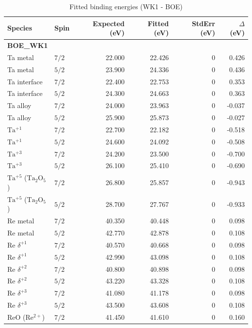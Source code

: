 \documentclass[12pt]{article}
\begin{document}
\begin{table}[H]
\centering
\begin{threeparttable}
\caption{Fitted binding energies (WK1 - BOE)}
\begin{tabular}{llrrrr}
\toprule
Species & Spin & Expected (eV) & Fitted (eV) & StdErr (eV) & $\Delta$ (eV) \\
\midrule
\multicolumn{6}{l}{\textbf{BOE\_WK1}} \\
Ta metal & $7/2$ & 22.000 & 22.426 & 0 & 0.426 \\
Ta metal & $5/2$ & 23.900 & 24.336 & 0 & 0.436 \\
Ta interface & $7/2$ & 22.400 & 22.753 & 0 & 0.353 \\
Ta interface & $5/2$ & 24.300 & 24.663 & 0 & 0.363 \\
Ta alloy & $7/2$ & 24.000 & 23.963 & 0 & -0.037 \\
Ta alloy & $5/2$ & 25.900 & 25.873 & 0 & -0.027 \\
$\mathrm{Ta^{+1}}$ & $7/2$ & 22.700 & 22.182 & 0 & -0.518 \\
$\mathrm{Ta^{+1}}$ & $5/2$ & 24.600 & 24.092 & 0 & -0.508 \\
$\mathrm{Ta^{+3}}$ & $7/2$ & 24.200 & 23.500 & 0 & -0.700 \\
$\mathrm{Ta^{+3}}$ & $5/2$ & 26.100 & 25.410 & 0 & -0.690 \\
$\mathrm{Ta^{+5}}$ ($\mathrm{Ta_2O_5}$) & $7/2$ & 26.800 & 25.857 & 0 & -0.943 \\
$\mathrm{Ta^{+5}}$ ($\mathrm{Ta_2O_5}$) & $5/2$ & 28.700 & 27.767 & 0 & -0.933 \\
Re metal & $7/2$ & 40.350 & 40.448 & 0 & 0.098 \\
Re metal & $5/2$ & 42.770 & 42.878 & 0 & 0.108 \\
$\mathrm{Re}$ $\delta^{+1}$ & $7/2$ & 40.570 & 40.668 & 0 & 0.098 \\
$\mathrm{Re}$ $\delta^{+1}$ & $5/2$ & 42.990 & 43.098 & 0 & 0.108 \\
$\mathrm{Re}$ $\delta^{+2}$ & $7/2$ & 40.800 & 40.898 & 0 & 0.098 \\
$\mathrm{Re}$ $\delta^{+2}$ & $5/2$ & 43.220 & 43.328 & 0 & 0.108 \\
$\mathrm{Re}$ $\delta^{+3}$ & $7/2$ & 41.080 & 41.178 & 0 & 0.098 \\
$\mathrm{Re}$ $\delta^{+3}$ & $5/2$ & 43.500 & 43.608 & 0 & 0.108 \\
$\mathrm{ReO}$ ($\mathrm{Re^{2+}}$) & $7/2$ & 41.450 & 41.610 & 0 & 0.160 \\

\end{tabular}
\end{threeparttable}
\end{table}
\end{document}
